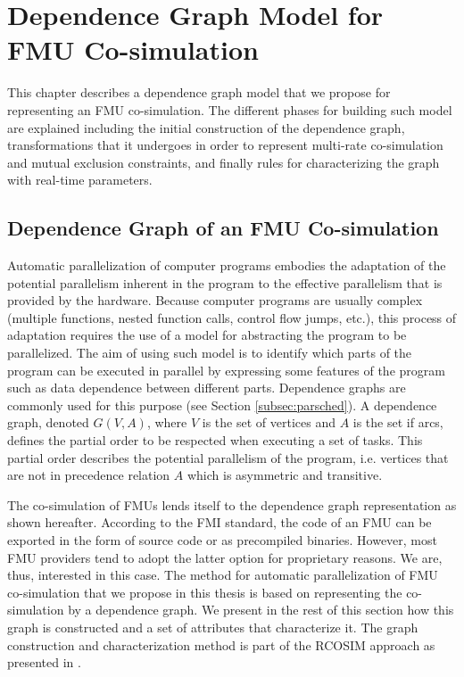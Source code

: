 \chapter{\label{ch:4-accel}Dependence Graph Model for FMU Co-simulation}

\minitoc

This chapter describes a dependence graph model that we propose for representing an FMU co-simulation. The different phases for building such model are explained including the initial construction of the dependence graph, transformations that it undergoes in order to represent multi-rate co-simulation and mutual exclusion constraints, and finally rules for characterizing the graph with real-time parameters.
 
\section{\label{sec:4-depgrph}Dependence Graph of an FMU Co-simulation}

Automatic parallelization of computer programs embodies the adaptation of the potential parallelism inherent in the program to the effective parallelism that is provided by the hardware. Because computer programs are usually complex (multiple functions, nested function calls, control flow jumps, etc.), this process of adaptation requires the use of a model for abstracting the program to be parallelized. The aim of using such model is to identify which parts of the program can be executed in parallel by expressing some features of the program such as data dependence between different parts. Dependence graphs are commonly used for this purpose (see Section \ref{subsec:parsched}). A dependence graph, denoted $G(V,A)$, where $V$ is the set of vertices and $A$ is the set if arcs, defines the partial order to be respected when executing a set of tasks. This partial order describes the potential parallelism of the program, i.e. vertices that are not in precedence relation $A$ which is asymmetric and transitive. %

The co-simulation of FMUs lends itself to the dependence graph representation as shown hereafter. According to the FMI standard, the code of an FMU can be exported in the form of source code or as precompiled binaries. However, most FMU providers tend to adopt the latter option for proprietary reasons. We are, thus, interested in this case. The method for automatic parallelization of FMU co-simulation that we propose in this thesis is based on representing the co-simulation by a dependence graph. We present in the rest of this section how this graph is constructed and a set of attributes that characterize it. The graph construction and characterization method is part of the RCOSIM approach as presented in \cite{benkhaled:2014}.

